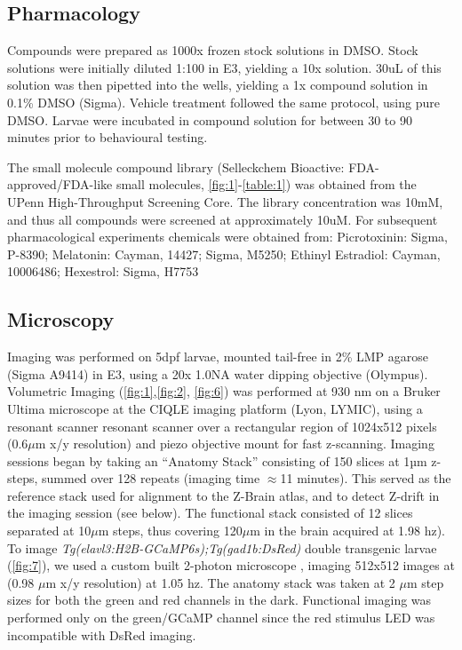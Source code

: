 \documentclass[9pt,lineno]{RandlettLab_elife}
\begin{document}
\subsection{Pharmacology}

Compounds were prepared as 1000x frozen stock solutions in DMSO. Stock solutions were initially diluted 1:100 in E3, yielding a 10x solution. 30uL of this solution was then pipetted into the wells, yielding a 1x compound solution in 0.1\% DMSO (Sigma). Vehicle treatment followed the same protocol, using pure DMSO. Larvae were incubated in compound solution for between 30 to 90 minutes prior to behavioural testing. 

The small molecule compound library (Selleckchem Bioactive: FDA-approved/FDA-like small molecules, \autoref{fig:1}-\autoref{table:1}) was obtained from the UPenn High-Throughput Screening Core. The library concentration was 10mM, and thus all compounds were screened at approximately 10uM. For subsequent pharmacological experiments chemicals were obtained from: Picrotoxinin: Sigma, P-8390; Melatonin: Cayman, 14427; Sigma, M5250; Ethinyl Estradiol: Cayman, 10006486; Hexestrol: Sigma, H7753

\subsection{Microscopy}

Imaging was performed on 5dpf larvae, mounted tail-free in 2\% LMP agarose (Sigma A9414) in E3, using a 20x 1.0NA water dipping objective (Olympus). Volumetric Imaging (\autoref{fig:1},\autoref{fig:2}, \autoref{fig:6})  was performed at 930 nm on a Bruker Ultima microscope at the CIQLE imaging platform (Lyon, LYMIC), using a resonant scanner resonant scanner over a rectangular region of 1024x512 pixels (0.6$\mu$m x/y resolution) and piezo objective mount for fast z-scanning. Imaging sessions began by taking an “Anatomy Stack” consisting of 150 slices at 1µm z-steps, summed over 128 repeats (imaging time $\approx$11 minutes). This served as the reference stack used for alignment to the Z-Brain atlas, and to detect Z-drift in the imaging session (see below). The functional stack consisted of 12 slices separated at 10$\mu$m steps, thus covering 120$\mu$m in the brain acquired at  1.98 hz). To image \emph{Tg(elavl3:H2B-GCaMP6s);Tg(gad1b:DsRed)} double transgenic larvae (\autoref{fig:7}), we used a custom built 2-photon microscope \citep{Haesemeyer2018-ww}, imaging 512x512 images at (0.98 $\mu$m x/y resolution) at 1.05 hz. The anatomy stack was taken at 2 $\mu$m step sizes for both the green and red channels in the dark. Functional imaging was performed only on the green/GCaMP channel since the red stimulus LED was incompatible with DsRed imaging. 
\end{document}
